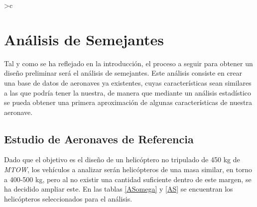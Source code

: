 \thispagestyle{empty}
\newcolumntype{g} {>{}c}
\chapter{Análisis de Semejantes}

Tal y como se ha reflejado en la introducción, el proceso a seguir para obtener un diseño preliminar será el análisis de semejantes.
Este análisis consiste en crear una base de datos de aeronaves ya existentes, cuyas características sean similares a las que podría tener la nuestra, de manera que mediante un análisis estadístico se pueda obtener una primera aproximación de algunas características de nuestra aeronave.

\section{Estudio de Aeronaves de Referencia}

Dado que el objetivo es el diseño de un helicóptero no tripulado de 450 kg de \emph{MTOW}, los vehículos a analizar serán helicópteros de una masa similar, en torno a 400-500 kg, pero al no existir una cantidad suficiente dentro de este margen, se ha decidido ampliar este.
En las tablas \ref{ASomega} y \ref{AS} se encuentran los helicópteros seleccionados para el análisis.

